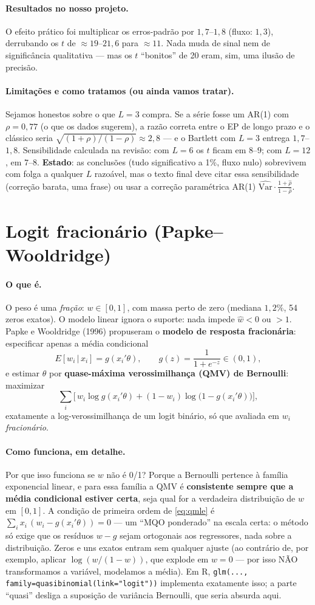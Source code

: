 \documentclass[11pt,a4paper]{article}
\newcommand{\oquee}[0]{\paragraph{O que é.}}
\newcommand{\comofunciona}[0]{\paragraph{Como funciona, em detalhe.}}
\newcommand{\resultados}[0]{\paragraph{Resultados no nosso projeto.}}
\newcommand{\limitacoes}[0]{\paragraph{Limitações e como tratamos (ou ainda vamos tratar).}}
\begin{document}
\resultados O efeito prático foi multiplicar os erros-padrão por $1{,}7$--$1{,}8$ (fluxo:
$1{,}3$), derrubando os $t$ de $\approx19$--$21{,}6$ para $\approx11$. Nada muda de sinal nem de
significância qualitativa --- mas os $t$ ``bonitos'' de 20 eram, sim, uma ilusão de precisão.

\limitacoes Sejamos honestos sobre o que $L=3$ compra. Se a série fosse um AR(1) com
$\rho=0{,}77$ (o que os dados sugerem), a razão correta entre o EP de longo prazo e o clássico
seria $\sqrt{(1+\rho)/(1-\rho)}\approx2{,}8$ --- e o Bartlett com $L=3$ entrega $1{,}7$--$1{,}8$.
Sensibilidade calculada na revisão: com $L=6$ os $t$ ficam em $8$--$9$; com $L=12$, em $7$--$8$.
\textbf{Estado}: as conclusões (tudo significativo a 1\%, fluxo nulo) sobrevivem com folga a
qualquer $L$ razoável, mas o texto final deve citar essa sensibilidade (correção barata, uma
frase) ou usar a correção paramétrica AR(1) $\widehat{\mathrm{Var}}\cdot\frac{1+\widehat\rho}{1-\widehat\rho}$.

\section{Logit fracionário (Papke--Wooldridge)}
\label{sec:fraclogit}

\oquee O peso é uma \emph{fração}: $w\in[0,1]$, com massa perto de zero (mediana $1{,}2\%$, 54
zeros exatos). O modelo linear ignora o suporte: nada impede $\widehat w<0$ ou $>1$. Papke e
Wooldridge (1996) propuseram o \textbf{modelo de resposta fracionária}: especificar apenas a média
condicional
\begin{equation}
E[w_i\,|\,x_i] = g(x_i'\theta), \qquad g(z)=\frac{1}{1+e^{-z}} \in (0,1),
\end{equation}
e estimar $\theta$ por \textbf{quase-máxima verossimilhança (QMV) de Bernoulli}: maximizar
\begin{equation}
\sum_i \Big[\, w_i \log g(x_i'\theta) + (1-w_i)\log\big(1-g(x_i'\theta)\big) \Big],
\label{eq:qmle}
\end{equation}
exatamente a log-verossimilhança de um logit binário, só que avaliada em $w_i$ \emph{fracionário}.

\comofunciona Por que isso funciona se $w$ não é 0/1? Porque a Bernoulli pertence à família
exponencial linear, e para essa família a QMV é \textbf{consistente sempre que a média condicional
estiver certa}, seja qual for a verdadeira distribuição de $w$ em $[0,1]$. A condição de primeira
ordem de \eqref{eq:qmle} é
$\sum_i x_i\,(w_i - g(x_i'\theta))=0$ --- um ``MQO ponderado'' na escala certa: o método só exige
que os resíduos $w-g$ sejam ortogonais aos regressores, nada sobre a distribuição. Zeros e uns
exatos entram sem qualquer ajuste (ao contrário de, por exemplo, aplicar
$\log(w/(1-w))$, que explode em $w=0$ --- por isso NÃO transformamos a variável, modelamos a
média). Em R, \texttt{glm(..., family=quasibinomial(link="logit"))} implementa exatamente isso; a
parte ``quasi'' desliga a suposição de variância Bernoulli, que seria absurda aqui.
\end{document}

